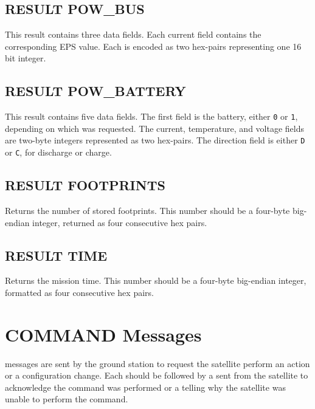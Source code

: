 \documentclass{article}
\begin{document}
    
  \subsection{RESULT POW\_BUS}
    This result contains three data fields. Each current field contains the corresponding EPS value. Each is encoded as
    two hex-pairs representing one 16 bit integer.
    
    
  \subsection{RESULT POW\_BATTERY}
    This result contains five data fields. The first field is the battery, either \texttt{0} or \texttt{1}, depending
    on which was requested. The current, temperature, and voltage fields are two-byte integers represented as two hex-pairs.
    The direction field is either \texttt{D} or \texttt{C}, for discharge or charge.
    
    
  \subsection{RESULT FOOTPRINTS}
  Returns the number of stored footprints. This number should be a four-byte big-endian
  integer, returned as four consecutive hex pairs.
  
  
  \subsection{RESULT TIME}
  Returns the mission time. This number should be a four-byte big-endian integer, 
  formatted as four consecutive hex pairs.
   
    
\pagebreak
\section{COMMAND Messages}
  \mcommand messages are sent by the ground station to request the satellite perform an action
  or a configuration change. Each \mcommand should be followed by a \macommand sent from the satellite
  to acknowledge the command was performed or a \merror telling why the satellite was unable to perform
  the command.
  
\end{document}
